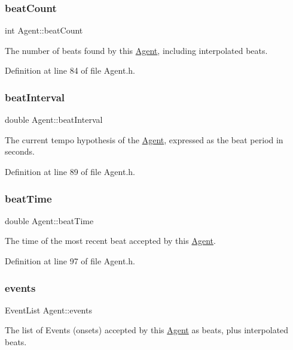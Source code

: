 \subsubsection{\texorpdfstring{beat\+Count}{beatCount}}
{\footnotesize\ttfamily int Agent\+::beat\+Count}

The number of beats found by this \hyperlink{class_agent}{Agent}, including interpolated beats. 

Definition at line 84 of file Agent.\+h.

\mbox{\label{class_agent_aa6ce02ae70357fef9fa397c2d129cb72}} 
\subsubsection{\texorpdfstring{beat\+Interval}{beatInterval}}
{\footnotesize\ttfamily double Agent\+::beat\+Interval}

The current tempo hypothesis of the \hyperlink{class_agent}{Agent}, expressed as the beat period in seconds. 

Definition at line 89 of file Agent.\+h.

\mbox{\label{class_agent_acc4850f7dcc7d04f56a770629282c551}} 
\subsubsection{\texorpdfstring{beat\+Time}{beatTime}}
{\footnotesize\ttfamily double Agent\+::beat\+Time}

The time of the most recent beat accepted by this \hyperlink{class_agent}{Agent}. 

Definition at line 97 of file Agent.\+h.

\mbox{\label{class_agent_a32dd69961705fcd29f725ebf2a2e81b4}} 
\subsubsection{\texorpdfstring{events}{events}}
{\footnotesize\ttfamily Event\+List Agent\+::events}

The list of Events (onsets) accepted by this \hyperlink{class_agent}{Agent} as beats, plus interpolated beats. 

